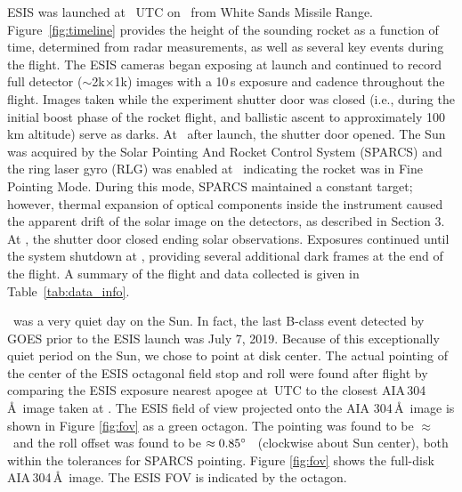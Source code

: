 		ESIS was launched at \timeMissionStart~UTC
		on \dateMission\ from White Sands Missile Range.  Figure~\ref{fig:timeline} provides the height of the sounding rocket as a function of time, determined from %
		radar measurements, as well as several key events during the flight.  
		The ESIS cameras began exposing at launch and continued to record full detector ($\sim$2k$\times$1k) images with a 10\,s exposure and cadence throughout the flight. Images taken while the
		experiment shutter door was closed (i.e., during the initial  boost phase of the rocket flight, and ballistic ascent to approximately 100\,km altitude) serve as darks.  
		At \timeMissionShutterOpen\ after launch, the shutter door %
		opened.  
		The Sun was acquired by the Solar Pointing And Rocket %
		Control System (SPARCS) and the ring laser gyro (RLG) was enabled at \timeMissionRlgEnable\ indicating the rocket was in Fine Pointing Mode.  
		During this mode, SPARCS maintained a constant target; however, thermal expansion of optical components inside the instrument caused the apparent drift of the solar image on the detectors, as described in Section 3.  
		At  \timeMissionShutterClose, the shutter door closed ending solar observations. Exposures continued until the system shutdown at \timeDataStop, providing several additional dark frames at the end of the flight.   A summary of the flight and data collected is given in Table~\ref{tab:data_info}.
		
	    \dateMission\ was a very quiet day on the Sun.  
	    In fact, the last  B-class event detected by GOES \citep{GOES} prior to the ESIS launch was July 7, 2019.  Because of this exceptionally quiet period on the Sun, we chose to point at disk center. 
	    The actual pointing of the center of the ESIS octagonal field stop and roll were found after flight by comparing the ESIS exposure nearest apogee at \timeApogeeFrame\,UTC to the closest AIA\,304\,\AA\ image taken at \aianearapogee.  
	    The ESIS field of view projected onto the AIA 304\,\AA\ image is shown in Figure \ref{fig:fov} as a green octagon.  
	    The pointing was found to be $\approx$ \esispointing \ and the roll offset was found to be $\approx 0.85^{\circ}$ \ (clockwise about Sun center), both within the tolerances for SPARCS pointing.  
	    Figure \ref{fig:fov} shows the full-disk AIA\,304\,\AA\ image. 
	    The ESIS FOV is indicated by the octagon.  
	    
